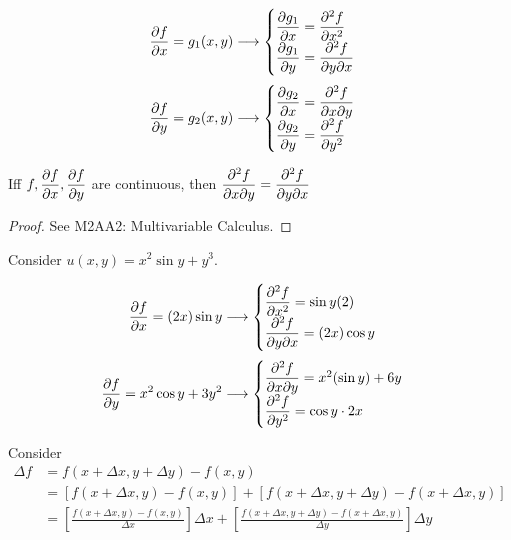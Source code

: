 \documentclass[twoside]{scrartcl}
\begin{document}
\[
\begin{aligned}
  \frac{\partial f}{\partial x} &= g_1(x,y) \longrightarrow \begin{cases}
 \dfrac{\partial g_1}{\partial x} = \dfrac{\partial^2f}{\partial x^2}\\[0.1cm]
 \dfrac{\partial g_1}{\partial y} = \dfrac{\partial^2f}{\partial y\partial x}
 \end{cases}\\[0.1cm]
   \dfrac{\partial f}{\partial y} &= g_2(x,y) \longrightarrow \begin{cases}
 \dfrac{\partial g_2}{\partial x} = \dfrac{\partial^2f}{\partial x\partial y}\\[0.1cm]
 \dfrac{\partial g_2}{\partial y} = \dfrac{\partial^2f}{\partial y^2}
 \end{cases}
\end{aligned}\]


\begin{theorem} Iff $f, \dfrac{\partial f}{\partial x}, \dfrac{\partial f}{\partial y}$ are continuous, then 
$\dfrac{\partial^2f}{\partial x\partial y} = \dfrac{\partial^2f}{\partial y\partial x}$
\end{theorem}
\begin{proof}
See M2AA2: Multivariable Calculus.
\end{proof}


\begin{example}
Consider $u(x,y) = x^2\sin y + y^3$. 

\[
\begin{aligned}
  \frac{\partial f}{\partial x} = (2x)\sin y&\longrightarrow \begin{cases}
 \dfrac{\partial^2f}{\partial x^2}= \sin y (2)\\[0.1cm]
 \dfrac{\partial^2f}{\partial y\partial x} = (2x)\cos y
 \end{cases}\\[0.1cm]
   \dfrac{\partial f}{\partial y} = x^2\cos y + 3y^2 &\longrightarrow \begin{cases}
 \dfrac{\partial^2f}{\partial x\partial y} =x^2(\sin y)+6y\\[0.1cm]
\dfrac{\partial^2f}{\partial y^2} = \cos y\cdot 2x
 \end{cases}
\end{aligned}\]
\end{example}

Consider 
\[
\begin{aligned}
  \Delta f &= f(x + \Delta x,y + \Delta y) - f(x,y)\\
  &= [f(x + \Delta x,y) - f(x,y)] + [f(x+\Delta x, y + \Delta y) - f(x + \Delta x,y)]\\
  &= \left[\frac{f(x+\Delta x,y)-f(x,y)}{\Delta x}\right]\Delta x
  + \left[\frac{f(x+\Delta x,y+\Delta y) - f(x+\Delta x,y)}{\Delta y}\right]\Delta y
\end{aligned}
\]
\end{document}
